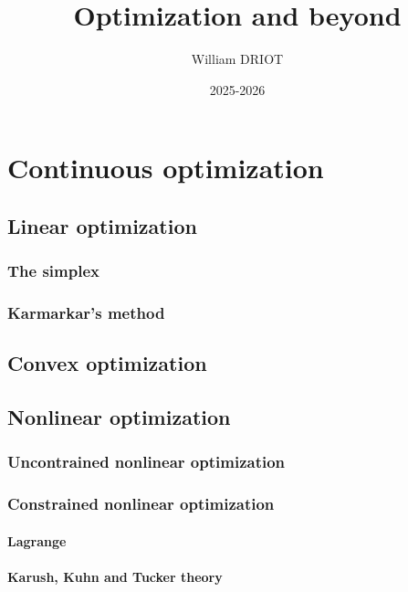 \documentclass[12pt,openany,oneside]{book}
\title{\textbf{Optimization and beyond}}
\author{William DRIOT}
\date{2025-2026}
\begin{document}
\maketitle

\tableofcontents

\newpage


% 
% 
% 
% 

\part{Continuous optimization}

\chapter{Linear optimization}

\section{The simplex}


\section{Karmarkar's method}

\chapter{Convex optimization}

\chapter{Nonlinear optimization}

\section{Uncontrained nonlinear optimization}
\section{Constrained nonlinear optimization}
\subsection{Lagrange}
\subsection{Karush, Kuhn and Tucker theory}
\end{document}
